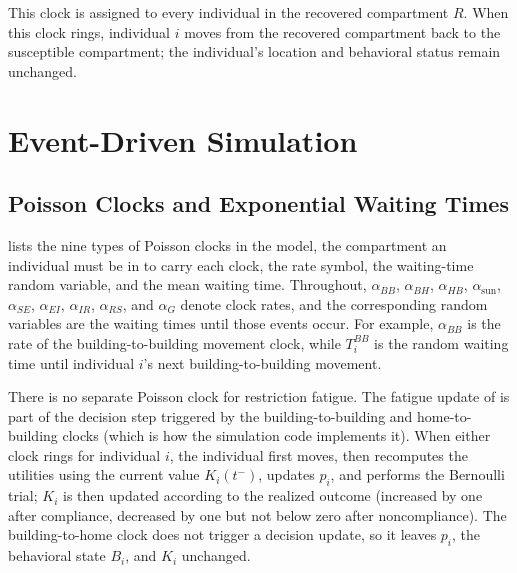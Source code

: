 \documentclass[11pt]{article}
\theoremstyle{definition}
\theoremstyle{plain}
\begin{document}
This clock is assigned to every individual in the recovered compartment $R$. When this clock rings, individual $i$ moves from the recovered compartment back to the susceptible compartment; the individual's location and behavioral status remain unchanged.


\section{Event-Driven Simulation}
\label{sec:simulation}

\subsection{Poisson Clocks and Exponential Waiting Times}
\label{sec:clocks}

 lists the nine types of Poisson clocks in the model, the compartment an individual must be in to carry each clock, the rate symbol, the waiting-time random variable, and the mean waiting time. Throughout, $\alpha_{BB}$, $\alpha_{BH}$, $\alpha_{HB}$, $\alpha_{\mathrm{sun}}$, $\alpha_{SE}$, $\alpha_{EI}$, $\alpha_{IR}$, $\alpha_{RS}$, and $\alpha_G$ denote clock rates, and the corresponding random variables are the waiting times until those events occur. For example, $\alpha_{BB}$ is the rate of the building-to-building movement clock, while $T_i^{BB}$ is the random waiting time until individual $i$'s next building-to-building movement.

There is no separate Poisson clock for restriction fatigue. The fatigue update of  is part of the decision step triggered by the building-to-building and home-to-building clocks (which is how the simulation code implements it). When either clock rings for individual $i$, the individual first moves, then recomputes the utilities using the current value $K_i(t^-)$, updates $p_i$, and performs the Bernoulli trial; $K_i$ is then updated according to the realized outcome (increased by one after compliance, decreased by one but not below zero after noncompliance). The building-to-home clock does not trigger a decision update, so it leaves $p_i$, the behavioral state $B_i$, and $K_i$ unchanged.
\end{document}
